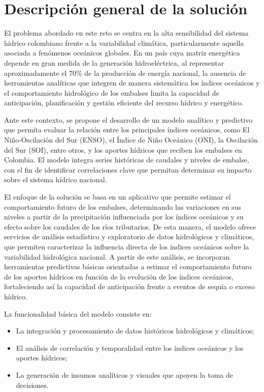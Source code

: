 \chapter{Descripción general de la solución}
\label{chp:1}

El problema abordado en este reto se centra en la alta sensibilidad del sistema hídrico colombiano frente a la variabilidad climática, particularmente aquella asociada a fenómenos oceánicos globales. En un país cuya matriz energética depende en gran medida de la generación hidroeléctrica, al representar aproximadamente el 70\% de la producción de energía nacional\cite{minenergia2023_hidroelectrica_sostenibilidad}, la ausencia de herramientas analíticas que integren de manera sistemática los índices oceánicos y el comportamiento hidrológico de los embalses limita la capacidad de anticipación, planificación y gestión eficiente del recurso hídrico y energético.

Ante este contexto, se propone el desarrollo de un modelo analítico y predictivo que permita evaluar la relación entre los principales índices oceánicos, como El Niño-Oscilación del Sur (ENSO), el Índice de Niño Oceánico (ONI), la Oscilación del Sur (SOI), entre otros, y los aportes hídricos que reciben los embalses en Colombia. El modelo integra series históricas de caudales y niveles de embalse, con el fin de identificar correlaciones clave que permitan determinar su impacto sobre el sistema hídrico nacional.

El enfoque de la solución se basa en un aplicativo que permite estimar el comportamiento futuro de los embalses, determinando las variaciones en sus niveles a partir de la precipitación influenciada por los índices oceánicos y su efecto sobre los caudales de los ríos tributarios. De esta manera, el modelo ofrece servicios de análisis estadístico y exploratorio de datos hidrológicos y climáticos, que permiten caracterizar la influencia directa de los índices oceánicos sobre la variabilidad hidrológica nacional. A partir de este análisis, se incorporan herramientas predictivas básicas orientadas a estimar el comportamiento futuro de los aportes hídricos en función de la evolución de los índices oceánicos, fortaleciendo así la capacidad de anticipación frente a eventos de sequía o exceso hídrico.

La funcionalidad básica del modelo consiste en:
\begin{itemize}
    \item La integración y procesamiento de datos históricos hidrológicos y climáticos;
    \item El análisis de correlación y temporalidad entre los índices oceánicos y los aportes hídricos;
    \item La generación de insumos analíticos y visuales que apoyen la toma de decisiones.
\end{itemize}

